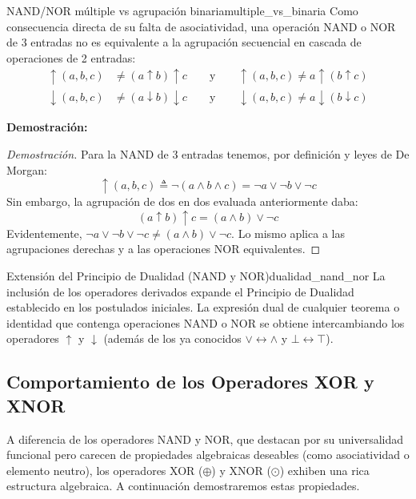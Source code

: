 \documentclass[12pt,a4paper]{article}
\newcommand{\desplegable}[2]{%
  \par\vspace{1ex}\noindent
  \textbf{Demostración:}
  \vspace{1ex}
  
  #2
  \par\vspace{1ex}
}
\begin{document}
\begin{teorema}{NAND/NOR múltiple vs agrupación binaria}{multiple_vs_binaria}
Como consecuencia directa de su falta de asociatividad, una operación NAND o NOR de 3 entradas no es equivalente a la agrupación secuencial en cascada de operaciones de 2 entradas:
\begin{align*}
    \uparrow(a,b,c) &\neq (a \uparrow b) \uparrow c \qquad \text{y} \qquad \uparrow(a,b,c) \neq a \uparrow (b \uparrow c) \\
    \downarrow(a,b,c) &\neq (a \downarrow b) \downarrow c \qquad \text{y} \qquad \downarrow(a,b,c) \neq a \downarrow (b \downarrow c)
\end{align*}
\end{teorema}
\desplegable{proof_multiple_vs_binaria}{
\begin{proof}[Demostración]
Para la NAND de 3 entradas tenemos, por definición y leyes de De Morgan:
\[ \uparrow(a,b,c) \triangleq \neg(a \wedge b \wedge c) = \neg a \vee \neg b \vee \neg c \]
Sin embargo, la agrupación de dos en dos evaluada anteriormente daba:
\[ (a \uparrow b) \uparrow c = (a \wedge b) \vee \neg c \]
Evidentemente, $\neg a \vee \neg b \vee \neg c \neq (a \wedge b) \vee \neg c$. Lo mismo aplica a las agrupaciones derechas y a las operaciones NOR equivalentes.
\end{proof}
}

\begin{teorema}{Extensión del Principio de Dualidad (NAND y NOR)}{dualidad_nand_nor}
La inclusión de los operadores derivados expande el Principio de Dualidad establecido en los postulados iniciales. La expresión dual de cualquier teorema o identidad que contenga operaciones NAND o NOR se obtiene intercambiando los operadores $\uparrow$ y $\downarrow$ (además de los ya conocidos $\vee \leftrightarrow \wedge$ y $\bot \leftrightarrow \top$).
\end{teorema}
\subsection{Comportamiento de los Operadores XOR y XNOR}
A diferencia de los operadores NAND y NOR, que destacan por su universalidad funcional pero carecen de propiedades algebraicas deseables (como asociatividad o elemento neutro), los operadores XOR ($\oplus$) y XNOR ($\odot$) exhiben una rica estructura algebraica. A continuación demostraremos estas propiedades.
\end{document}
